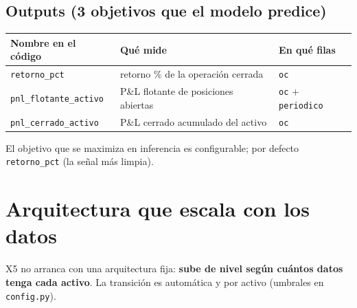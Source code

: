 \documentclass[11pt,a4paper]{article}
\newcommand{\code}[1]{\texttt{#1}}
\begin{document}
\subsection{Outputs (3 objetivos que el modelo predice)}

\begin{center}
\begin{tabular}{@{}lll@{}}
\toprule
\textbf{Nombre en el código} & \textbf{Qué mide} & \textbf{En qué filas} \\
\midrule
\code{retorno\_pct} & retorno \% de la operación cerrada & \code{oc} \\
\code{pnl\_flotante\_activo} & P\&L flotante de posiciones abiertas & \code{oc} + \code{periodico} \\
\code{pnl\_cerrado\_activo} & P\&L cerrado acumulado del activo & \code{oc} \\
\bottomrule
\end{tabular}
\end{center}

El objetivo que se maximiza en inferencia es configurable; por defecto \code{retorno\_pct}
(la señal más limpia).

\section{Arquitectura que escala con los datos}

X5 no arranca con una arquitectura fija: \textbf{sube de nivel según cuántos datos tenga cada
activo}. La transición es automática y por activo (umbrales en \code{config.py}).

\begin{center}
\end{center}
\end{document}
